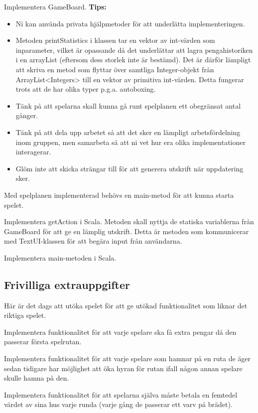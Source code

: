 \Subtask Implementera GameBoard.
\newline
\newline
\textbf{Tips:}

\begin{itemize}
\item Ni kan använda privata hjälpmetoder för att underlätta implementeringen.
\item Metoden printStatistics i klassen  tar en vektor av int-värden som inparameter, vilket är opassande då det underlättar att lagra pengahistoriken i en arrayList (eftersom dess storlek inte är bestämd). Det är därför lämpligt att skriva en metod som flyttar över samtliga Integer-objekt från ArrayList<Integers> till en vektor av primitiva int-värden. Detta fungerar trots att de har olika typer p.g.a. autoboxing. 
\item Tänk på att spelarna skall kunna gå runt spelplanen ett obegränsat antal gånger.
\item Tänk på att dela upp arbetet så att det sker en lämpligt arbetsfördelning inom gruppen, men samarbeta så att ni vet hur era olika implementationer interagerar.
\item Glöm inte att skicka strängar till   för att generera utskrift när uppdatering sker.
\end{itemize}

\Task Med spelplanen implementerad behövs en main-metod för att kunna starta spelet.  

\Subtask Implementera getAction i Scala. Metoden skall nyttja de statiska variablerna från GameBoard för att ge en lämplig utskrift. Detta är metoden som kommunicerar med TextUI-klassen för att begära input från användarna.

\Subtask Implementera main-metoden i Scala.




\subsection{Frivilliga extrauppgifter}

\Task Här är det dags att utöka spelet för att ge utökad funktionalitet som liknar det riktiga spelet.

\Subtask Implementera funktionalitet för att varje spelare ska få extra pengar då den passerar första spelrutan.

\Subtask Implementera funktionalitet för att varje spelare som hamnar på en ruta de äger sedan tidigare har möjlighet att öka hyran för rutan ifall någon annan spelare skulle hamna på den.

\Subtask Implementera funktionalitet för att spelarna själva måste betala en femtedel värdet av sina hus varje runda (varje gång de passerar ett varv på brädet).
    
